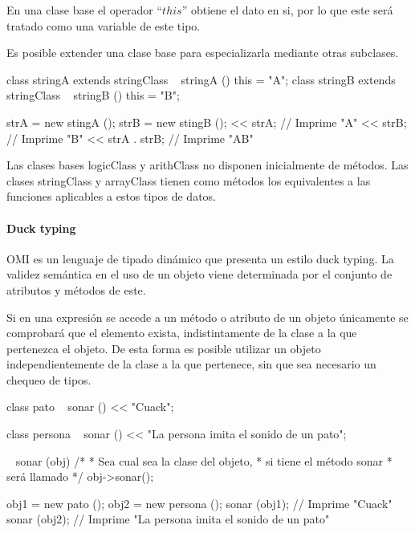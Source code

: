  En una clase base el operador ``$this$'' obtiene el dato en si, por lo que este será tratado como una variable
 de este tipo.
 
 Es posible extender una clase base para especializarla mediante otras subclases. \\
 
 \begin{myverbatim}
   class stringA extends stringClass {
      ~ stringA (){
         this = "A";
      }
   }
   class stringB extends stringClass {
      ~ stringB (){
         this = "B";
      }
   }

   strA = new stingA ();
   strB = new stingB ();
   << strA; // Imprime "A"
   << strB; // Imprime "B"
   << strA . strB; // Imprime "AB"
\end{myverbatim}

Las clases bases logicClass y arithClass no disponen inicialmente de métodos.
Las clases stringClass y arrayClass tienen como métodos los equivalentes 
a las funciones aplicables a estos tipos de datos.

\paragraph{Duck typing}

OMI es un lenguaje de tipado dinámico que presenta un estilo duck typing.
La validez semántica en el uso de un objeto viene determinada
por el conjunto de atributos y métodos de este. 

Si en una expresión se accede a un método o atributo de un objeto únicamente se
comprobará que el elemento exista, indistintamente de la clase a la que pertenezca 
el objeto. De esta forma es posible utilizar un objeto independientemente de 
la clase a la que pertenece, sin que sea necesario un chequeo de tipos. \\

\begin{myverbatim}
   class pato {
      ~ sonar () {
         << "Cuack";
      }
   }

   class persona {
      ~ sonar () {
         << "La persona imita el sonido de un pato";
      }
   }


   ~ sonar (obj) {
      /*
       * Sea cual sea la clase del objeto, 
       * si tiene el método sonar
       * será llamado
       */
      obj->sonar();
   }

   obj1 = new pato ();
   obj2 = new persona ();
   sonar (obj1); // Imprime "Cuack"
   sonar (obj2); // Imprime "La persona imita el sonido de un pato"
\end{myverbatim}

